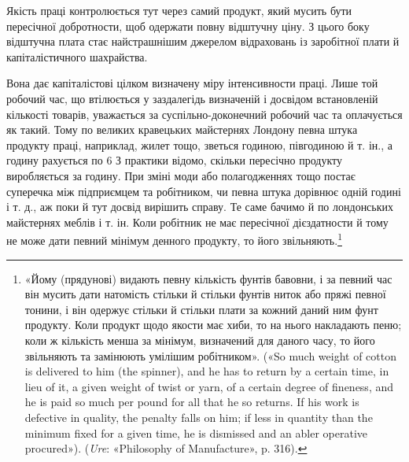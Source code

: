 Якість праці контролюється тут через самий продукт, який
мусить бути пересічної добротности, щоб одержати повну відштучну
ціну. З цього боку відштучна плата стає найстрашнішим
джерелом відраховань із заробітної плати й капіталістичного
шахрайства.

Вона дає капіталістові цілком визначену міру інтенсивности
праці. Лише той робочий час, що втілюється у заздалегідь визначеній
і досвідом встановленій кількості товарів, уважається за
суспільно-доконечний робочий час та оплачується як такий.
Тому по великих кравецьких майстернях Лондону певна штука
продукту праці, наприклад, жилет тощо, зветься годиною,
півгодиною й т. ін., а годину рахується по 6 З практики
відомо, скільки пересічно продукту виробляється за годину.
При зміні моди або полагодженнях тощо постає суперечка між
підприємцем та робітником, чи певна штука дорівнює одній годині
і т. д., аж поки й тут досвід вирішить справу. Те саме бачимо й
по лондонських майстернях меблів і т. ін. Коли робітник не має
пересічної дієздатности й тому не може дати певний мінімум денного
продукту, то його звільняють.\footnote{
«Йому (прядунові) видають певну кількість фунтів бавовни, і за
певний час він мусить дати натомість стільки й стільки фунтів ниток
або пряжі певної тонини, і він одержує стільки й стільки плати за кожний
даний ним фунт продукту. Коли продукт щодо якости має хиби, то
на нього накладають пеню; коли ж кількість менша за мінімум, визначений
для даного часу, то його звільняють та замінюють умілішим робітником».
(«So much weight of cotton is delivered to him (the spinner),
and he has to return by a certain time, in lieu of it, a given weight of
twist or yarn, of a certain degree of fineness, and he is paid so much per
pound for all that he so returns. If his work is defective in quality, the
penalty falls on him; if less in quantity than the minimum fixed for a
given time, he is dismissed and an abler operative procured»). (\emph{Ure}: «Philosophy
of Manufacture», p. 316).
}

